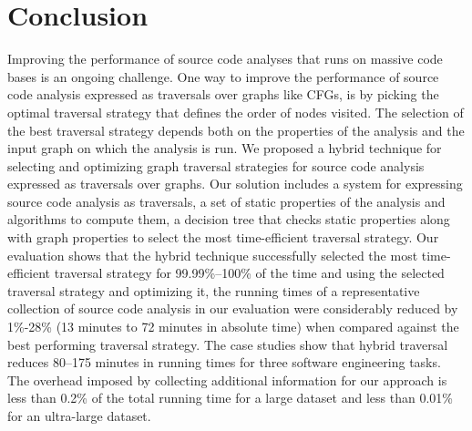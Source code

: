 \chapter{Conclusion}
\label{conclusion}
Improving the performance of source code analyses that runs on massive code bases
is an ongoing challenge. One way to improve the performance of
source code analysis expressed as traversals over graphs like CFGs, is by picking
the optimal traversal strategy that defines the order of nodes visited. The
selection of the best traversal strategy depends both on the properties of the
analysis and the input graph on which the analysis is run.
We proposed a hybrid technique for selecting and optimizing graph traversal
strategies for source code analysis expressed as traversals over graphs. Our
solution includes a system for expressing source code analysis as traversals, a set
of static properties of the analysis and algorithms to compute them, a decision
tree that checks static properties along with graph properties to select the
most time-efficient traversal strategy.
Our evaluation shows that the hybrid technique successfully selected the most
time-efficient traversal strategy for 99.99\%--100\% of the time and 
using the selected traversal strategy and optimizing it, the running times of a
representative collection of source code analysis in our evaluation
were considerably reduced by 1\%-28\% (13 minutes to 72 minutes in absolute time) when compared against the best performing traversal strategy. The case studies show that hybrid traversal reduces 80--175 minutes in running times for three software engineering tasks. The overhead imposed by 
collecting additional information for our approach is less than 0.2\% of 
the total running time for a large dataset and less than 0.01\% for an 
ultra-large dataset.